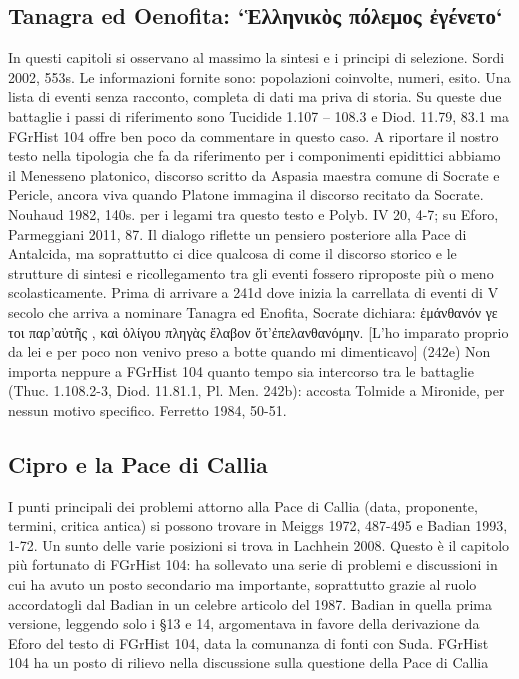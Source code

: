 {            \subsection*{Tanagra ed Oenofita: `Ἑλληνικὸς πόλεμος ἐγένετο`}
            In questi capitoli si osservano al massimo la sintesi e i principi di selezione. Sordi 2002, 553s. Le informazioni fornite sono: popolazioni coinvolte,  numeri,  esito. Una lista di eventi senza racconto, completa di dati ma priva di storia.  Su queste due battaglie i passi di riferimento sono  Tucidide 1.107 – 108.3 e  Diod. 11.79, 83.1 ma FGrHist 104 offre ben poco da commentare in questo caso. A riportare il nostro testo nella tipologia che fa da riferimento per i componimenti epidittici abbiamo il Menesseno  platonico, discorso scritto da Aspasia maestra comune di Socrate e Pericle, ancora viva quando Platone immagina il discorso recitato da Socrate. Nouhaud 1982, 140s. per i legami tra questo testo e Polyb. IV 20, 4-7; su Eforo, Parmeggiani 2011, 87. Il dialogo riflette un pensiero posteriore alla Pace di Antalcida, ma soprattutto ci dice qualcosa di come il discorso storico e le strutture di sintesi e ricollegamento tra gli eventi fossero riproposte più o meno scolasticamente. Prima di arrivare a 241d dove inizia la carrellata di eventi di V secolo che arriva a nominare Tanagra ed Enofita, Socrate dichiara: \textgreek{ἑμάνθανόν γε τοι παρ’αὐτῆς , καὶ ὁλίγου πληγὰς ἔλαβον ὅτ’ἐπελανθανόμην}. [L'ho imparato proprio da lei e per poco non venivo preso a botte quando mi dimenticavo] (242e) Non importa neppure a FGrHist 104 quanto tempo sia intercorso tra le battaglie (Thuc. 1.108.2-3, Diod. 11.81.1, Pl. Men. 242b): accosta Tolmide a Mironide, per nessun motivo specifico. Ferretto 1984, 50-51.
            \subsection*{Cipro e la Pace di Callia}
             I punti principali dei problemi attorno alla Pace di Callia (data, proponente, termini, critica antica) si possono trovare in Meiggs 1972, 487-495 e Badian 1993, 1-72. Un sunto delle varie posizioni si trova in Lachhein 2008. Questo è il capitolo più fortunato di FGrHist 104: ha sollevato una serie di problemi e discussioni in cui ha avuto un posto secondario ma importante, soprattutto grazie al ruolo accordatogli dal Badian in un celebre articolo del 1987. Badian in quella prima versione, leggendo solo i §13 e 14, argomentava in favore della derivazione da Eforo del testo di FGrHist 104, data la comunanza di fonti con Suda. FGrHist 104 ha un posto di rilievo nella discussione sulla questione della Pace di Callia 

}
